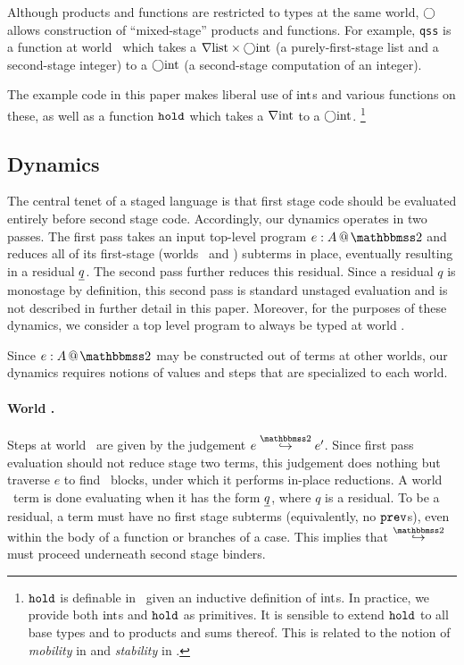 \begin{abstrsyn}
Although products and functions are restricted to types at the same world,
$\bigcirc$ allows construction of ``mixed-stage'' products and functions.
For example, \texttt{qss} is a function at world \bbonem\ which takes a
$\nabla{\rm list} \times \bigcirc{\rm int}$ (a purely-first-stage list and a
second-stage integer) to a $\bigcirc{\rm int}$ (a second-stage
computation of an integer).

The example code in this paper makes liberal use of ${\rm int}$s and various
functions on these, as well as a function ${\tt hold}$ which takes a $\nabla{\rm int}$
to a $\bigcirc{\rm int}$.%
\footnote{${\tt hold}$ is definable in \lang\ given an inductive definition of
${\rm int}$s. In practice, we provide both ${\rm int}$s and ${\tt hold}$ as primitives.
It is sensible to extend ${\tt hold}$ to all base types and to products and sums
thereof. This is related to the notion of {\em mobility} in \cite{murphy05} and
{\em stability} in \cite{krishnaswami13}.}

\end{abstrsyn}


\subsection{Dynamics}
\label{sec:dynamics}




The central tenet of a staged language
is that first stage code should be evaluated entirely before second stage code.
Accordingly, our dynamics operates in two passes.
The first pass takes an input top-level program $\coltwo e A$
and reduces all of its first-stage (worlds \bbonem\ and \bbonep) subterms in place,
eventually resulting in a residual $\underline{q}$.
The second pass further reduces this residual.
Since a residual $q$ is monostage by definition, this second pass is standard unstaged evaluation
and is not described in further detail in this paper.
Moreover, for the purposes of these dynamics, we consider a top level program to always be typed at world \bbtwo.

Since $\coltwo e A$ may be constructed out of terms at other worlds, 
our dynamics requires notions of values and steps that are specialized to each world.

\paragraph{World \bbtwo.} Steps at world \bbtwo\ are given by the judgement \mbox{$\steptwo e {e'}$}.
Since first pass evaluation should not reduce stage two terms, this judgement does nothing but traverse $e$ to find \prev\ blocks, under which it performs in-place reductions.
A world \bbtwo\ term is done evaluating when it has the form $\underline{q}$, where $q$ is a residual. 
To be a residual, a term must have no first stage subterms (equivalently, no ${\tt prev}$s), even within the body of a function or branches of a case.
This implies that $\stepsym \bbtwo$ must proceed underneath second stage binders.

